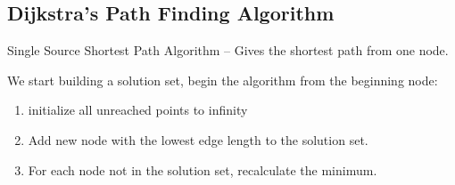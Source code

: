 \documentclass [12 pt, twoside] {article}
\begin{document}
\subsection{Dijkstra's Path Finding Algorithm}
Single Source Shortest Path Algorithm -- Gives the shortest path from one node.

We start building a solution set, begin the algorithm from the beginning node:
\begin{enumerate}
    \item initialize all unreached points to infinity
    \item Add new node with the lowest edge length to the solution set.
    \item For each node not in the solution set, recalculate the minimum.
\end{enumerate}
\end{document}
